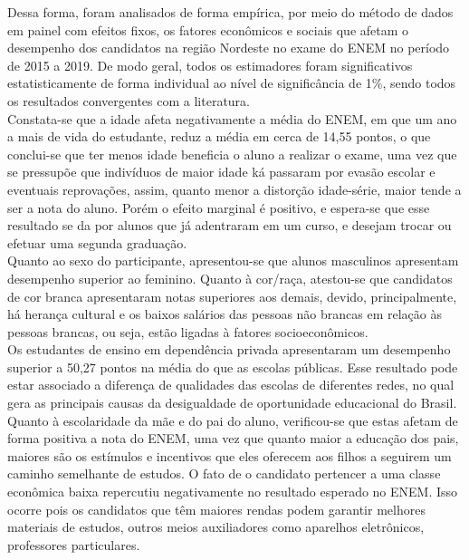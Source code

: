 \documentclass[tcc1,project]{uftex}
\begin{document}
Dessa forma, foram analisados de forma empírica, por meio do método de dados em painel com efeitos fixos, os fatores econômicos e sociais que afetam o desempenho dos candidatos na região Nordeste no exame do ENEM no período de 2015 a 2019. De modo geral, todos os estimadores foram significativos estatisticamente de forma individual ao nível de significância de 1\%, sendo todos os resultados convergentes com a literatura. \\ 

Constata-se que a idade afeta negativamente a média do ENEM, em que um ano a mais de vida do estudante, reduz a média em cerca de 14,55 pontos, o que conclui-se que ter menos idade beneficia o aluno a realizar o exame, uma vez que se pressupõe que indivíduos de maior idade ká passaram por evasão escolar e eventuais reprovações, assim, quanto menor a distorção idade-série, maior tende a ser a nota do aluno. Porém o efeito marginal é positivo, e espera-se que esse resultado se da por alunos que já adentraram em um curso, e desejam trocar ou efetuar uma segunda graduação. \\

Quanto ao sexo do participante, apresentou-se que alunos masculinos apresentam desempenho superior ao feminino. Quanto à cor/raça, atestou-se que candidatos de cor branca apresentaram notas superiores aos demais, devido, principalmente, há herança cultural e os baixos salários das pessoas não brancas em relação às pessoas brancas, ou seja, estão ligadas à fatores socioeconômicos. \\

Os estudantes de ensino em dependência privada apresentaram um desempenho superior a 50,27 pontos na média do que as escolas públicas. Esse resultado pode estar associado a diferença de qualidades das escolas de diferentes redes, no qual gera as principais causas da desigualdade de oportunidade educacional do Brasil. \\

Quanto à escolaridade da mãe e do pai do aluno, verificou-se que estas afetam de forma positiva a nota do ENEM, uma vez que quanto maior a educação dos pais, maiores são os estímulos e incentivos que eles oferecem aos filhos a seguirem um caminho semelhante de estudos. O fato de o candidato pertencer a uma classe econômica baixa repercutiu negativamente no resultado esperado no ENEM. Isso ocorre pois os candidatos que têm maiores rendas podem garantir melhores materiais de estudos, outros meios auxiliadores como aparelhos eletrônicos, professores particulares. \\
\end{document}

